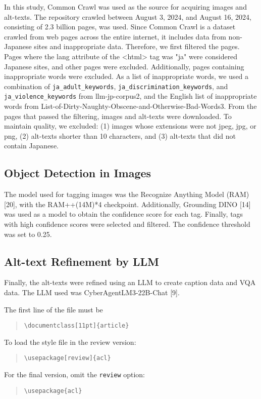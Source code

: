 \documentclass[11pt]{article}
\begin{document}
In this study, Common Crawl was used as the source for acquiring images and alt-texts. The repository crawled between August 3, 2024, and August 16, 2024, consisting of 2.3 billion pages, was used.
Since Common Crawl is a dataset crawled from web pages across the entire internet, it includes data from non-Japanese sites and inappropriate data. Therefore, we first filtered the pages. Pages where the lang attribute of the <html> tag was "ja" were considered Japanese sites, and other pages were excluded. Additionally, pages containing inappropriate words were excluded. As a list of inappropriate words, we used a combination of \verb|ja_adult_keywords|, \verb|ja_discrimination_keywords|, and \verb|ja_violence_keywords| from llm-jp-corpus2, and the English list of inappropriate words from List-of-Dirty-Naughty-Obscene-and-Otherwise-Bad-Words3.
From the pages that passed the filtering, images and alt-texts were downloaded. To maintain quality, we excluded: (1) images whose extensions were not jpeg, jpg, or png, (2) alt-texts shorter than 10 characters, and (3) alt-texts that did not contain Japanese.

\subsection{Object Detection in Images}

The model used for tagging images was the Recognize Anything Model (RAM) [20], with the RAM++(14M)*4 checkpoint. Additionally, Grounding DINO [14] was used as a model to obtain the confidence score for each tag.
Finally, tags with high confidence scores were selected and filtered. The confidence threshold was set to 0.25.

\subsection{Alt-text Refinement by LLM}

Finally, the alt-texts were refined using an LLM to create caption data and VQA data. The LLM used was CyberAgentLM3-22B-Chat [9].

The first line of the file must be
\begin{quote}
  \begin{verbatim}
\documentclass[11pt]{article}
\end{verbatim}
\end{quote}

To load the style file in the review version:
\begin{quote}
  \begin{verbatim}
\usepackage[review]{acl}
\end{verbatim}
\end{quote}
For the final version, omit the \verb|review| option:
\begin{quote}
  \begin{verbatim}
\usepackage{acl}
\end{verbatim}
\end{quote}
\end{document}
